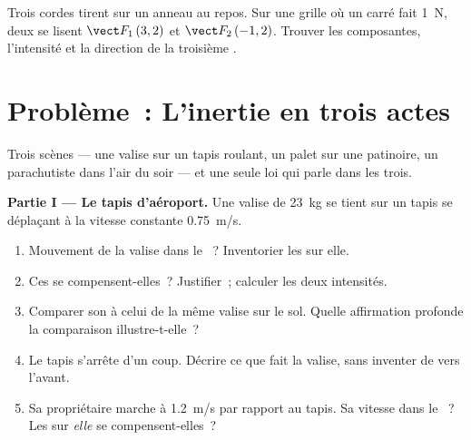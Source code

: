 \begin{exercise}[$\star\star\star$]\label{exo:g10:inertia:15}
Trois cordes tirent sur un anneau au repos. Sur une grille où un carré
fait \qty{1}{N}, deux  se lisent
$\vect F_1\,(3, 2)$ et $\vect F_2\,(-1, 2)$. Trouver les composantes,
l'intensité et la direction de la troisième .
\end{exercise}

\section{Problème~: L'inertie en trois actes}

\begin{problem}
\label{pb:g10:inertia:1}
Trois scènes --- une valise sur un tapis roulant, un palet sur une
patinoire, un parachutiste dans l'air du soir --- et une seule loi qui
parle dans les trois.

\medskip
\noindent\textbf{Partie I --- Le tapis d'aéroport.}
Une valise de \qty{23}{kg} se tient sur un tapis se déplaçant à la
vitesse constante \qty{0.75}{m/s}.
\begin{enumerate}
  \item Mouvement de la valise dans le ~?
        Inventorier les  sur elle.
  \item Ces  se compensent-elles~?
        Justifier~; calculer les deux intensités.
  \item Comparer son  à celui de la même
        valise sur le sol. Quelle affirmation profonde la comparaison
        illustre-t-elle~?
  \item Le tapis s'arrête d'un coup. Décrire ce que fait la valise,
        sans inventer de  vers l'avant.
  \item Sa propriétaire marche à \qty{1.2}{m/s} par rapport au tapis.
        Sa vitesse dans le ~? Les
         sur \emph{elle} se
        compensent-elles~?
\end{enumerate}


\end{problem}

